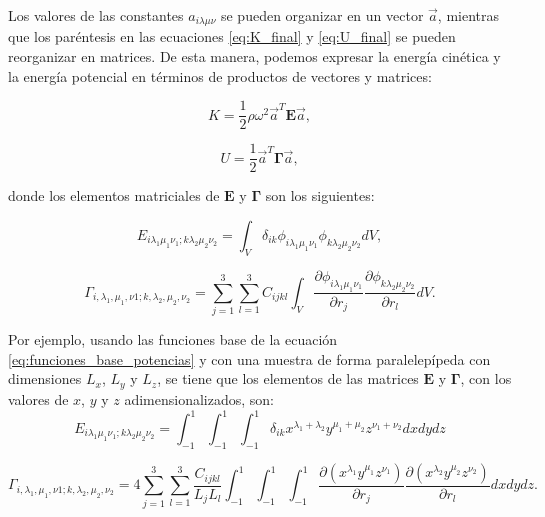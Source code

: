 \documentclass[12pt]{article}
\begin{document}
Los valores de las constantes $a_{i \lambda \mu \nu}$ se pueden organizar en un vector $\vec{a}$, mientras que los paréntesis en las ecuaciones \ref{eq:K_final} y \ref{eq:U_final} se pueden reorganizar en matrices. De esta manera, podemos expresar la energía cinética y la energía potencial en términos de productos de vectores y matrices: 

\begin{equation}
	K = \frac{1}{2} \rho \omega^2 \vec{a}^{T}\bm{E}\vec{a},
	\label{eq:K_matrix}
\end{equation}

\begin{equation}
	U = \frac{1}{2} \vec{a}^{T}\bm{\Gamma}\vec{a},
\end{equation}

donde los elementos matriciales de $\bm{E}$ y $\bm{\Gamma}$ son los siguientes:

\begin{equation}
	E_{i \lambda_1 \mu_1 \nu_1; k \lambda_2 \mu_2 \nu_2} = \int_{V}{\delta_{ik} \phi_{i \lambda_1 \mu_1 \nu_1}  \phi_{k \lambda_2 \mu_2 \nu_2} dV},
	\label{eq:matriz_E}
\end{equation}

\begin{equation}
    \Gamma_{i, \lambda_1, \mu_1,  \nu1; k, \lambda_2, \mu_2, \nu_2} = \sum_{j=1}^{3} \sum_{l=1}^{3} {C_{ijkl} \int_{V}{\frac{\partial \phi_{i \lambda_{1} \mu_1 \nu_1}}{\partial r_j} \frac{\partial \phi_{k \lambda_2 \mu_2 \nu_2}}{\partial r_l} dV}}.
	\label{eq:matriz_gamma}
\end{equation}

Por ejemplo, usando las funciones base de la ecuación \ref{eq:funciones_base_potencias} y con una muestra de forma paralelepípeda con dimensiones $L_x$, $L_y$ y $L_z$, se tiene que los elementos de las matrices $\bm{E}$ y $\bm{\Gamma}$, con los valores de $x$, $y$ y $z$ adimensionalizados, son:
\begin{equation}
	E_{i \lambda_1 \mu_1 \nu_1; k \lambda_2 \mu_2 \nu_2} = \int_{-1}^{1} \int_{-1}^{1} \int_{-1}^{1} {\delta_{ik} x^{\lambda_1 + \lambda_2} y^{\mu_1 + \mu_2} z^{\nu_1 + \nu_2} dx dy dz}
	\label{eq:matriz_E_paralelepípedo_pot}
\end{equation}

\begin{equation}
    \Gamma_{i, \lambda_1, \mu_1,  \nu1; k, \lambda_2, \mu_2, \nu_2} = 4\sum_{j=1}^{3} \sum_{l=1}^{3} \frac{C_{ijkl}}{L_j L_l} \int_{-1}^{1} \int_{-1}^{1} \int_{-1}^{1} {\frac{\partial (x^{\lambda_1} y^{\mu_1} z^{\nu_1})}{\partial r_j} \frac{\partial (x^{\lambda_2} y^{\mu_2} z^{\nu_2})}{\partial r_l} dx dy dz}.
	\label{eq:matriz_gamma_paralelepípedo_pot}
\end{equation}
\end{document}
